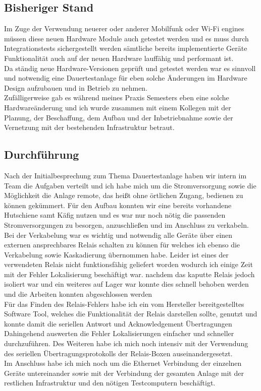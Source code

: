 \subsection{Bisheriger Stand}
Im Zuge der Verwendung  neuerer oder anderer Mobilfunk oder Wi-Fi engines müssen diese neuen Hardware Module auch getestet werden und es muss  durch Integrationstests sichergestellt werden sämtliche bereits implementierte Geräte Funktionalität auch auf der neuen Hardware lauffähig und performant ist.   \\
Da ständig neue Hardware-Versionen geprüft und getestet werden war es sinnvoll und notwendig eine  Dauertestanlage für eben solche Änderungen im Hardware Design  aufzubauen und in Betrieb zu nehmen. \\
Zufälligerweise gab es während meines Praxis Semesters eben eine solche Hardwareänderung und ich wurde zusammen mit einem Kollegen mit der Planung, der Beschaffung, dem Aufbau und der Inbetriebnahme sowie der Vernetzung mit der bestehenden Infrastruktur betraut. \\

\subsection{Durchführung}
Nach der Initialbesprechung zum Thema Dauertestanlage  haben wir intern im Team die Aufgaben verteilt und ich habe mich um die Stromversorgung sowie die Möglichkeit die Anlage remote, das heißt ohne örtlichen Zugang, bedienen zu können gekümmert.  Für den Aufbau konnten wir eine bereits vorhandene Hutschiene samt Käfig nutzen und es war nur noch nötig  die passenden Stromversorgungen zu besorgen, anzuschließen und im Anschluss zu verkabeln.  \\
Bei der Verkabelung war es wichtig und notwendig alle Geräte über einen externen ansprechbares Relais schalten zu können für welches ich ebenso die Verkabelung sowie Kaskadierung übernommen habe. Leider  ist eines der verwendeten Relais nicht funktionsfähig geliefert worden wodurch ich einige Zeit mit der Fehler Lokalisierung beschäftigt war. nachdem das kaputte Relais jedoch isoliert war und ein weiteres auf Lager war konnte dies schnell behoben werden und die Arbeiten konnten abgeschlossen werden \\
Für das Finden des Relais-Fehlers habe ich ein vom Hersteller bereitgestelltes Software Tool, welches die Funktionalität der Relais darstellen sollte, genutzt und konnte damit die seriellen Antwort und Acknowledgement Übertragungen Dahingehend auswerten die Fehler Lokalisierungen einfacher und schneller durchzuführen. Des Weiteren habe ich mich noch intensiv mit der Verwendung des seriellen Übertragungsprotokolls der Relais-Boxen auseinandergesetzt. \\
Im Anschluss habe ich mich noch um die Ethernet Verbindung der einzelnen Geräte untereinander sowie mit der Verbindung der gesamten Anlage mit der restlichen Infrastruktur und den nötigen Testcomputern beschäftigt.  \\

